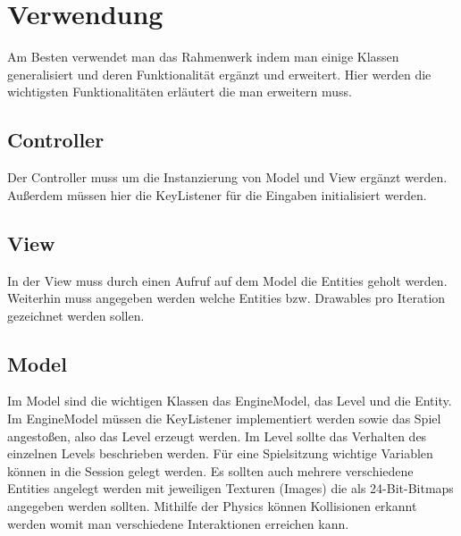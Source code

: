 \section{Verwendung}

Am Besten verwendet man das Rahmenwerk indem man einige Klassen generalisiert und deren Funktionalität ergänzt und erweitert. Hier werden die wichtigsten Funktionalitäten erläutert die man erweitern muss.

\subsection{Controller}

Der Controller muss um die Instanzierung von Model und View ergänzt werden. Außerdem müssen hier die KeyListener für die Eingaben initialisiert werden.

\subsection{View}

In der View muss durch einen Aufruf auf dem Model die Entities geholt werden. Weiterhin muss angegeben werden welche Entities bzw. Drawables pro Iteration gezeichnet werden sollen.

\subsection{Model}

Im Model sind die wichtigen Klassen das EngineModel, das Level und die Entity. Im EngineModel müssen die KeyListener implementiert werden sowie das Spiel angestoßen, also das Level erzeugt werden. Im Level sollte das Verhalten des einzelnen Levels beschrieben werden. Für eine Spielsitzung wichtige Variablen können in die Session gelegt werden. Es sollten auch mehrere verschiedene Entities angelegt werden mit jeweiligen Texturen (Images) die als 24-Bit-Bitmaps angegeben werden sollten. Mithilfe der Physics können Kollisionen erkannt werden womit man verschiedene Interaktionen erreichen kann.